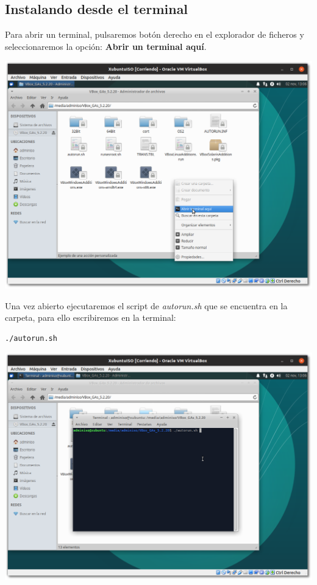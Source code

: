 \documentclass[11pt]{article}
\begin{document}
\subsection{Instalando desde el terminal}
\label{sec:org902a1d3}
Para abrir un terminal, pulsaremos botón derecho en el explorador de
ficheros y seleccionaremos la opción: \textbf{Abrir un terminal aquí}.

\begin{center}
\includegraphics[width=.9\linewidth]{imgs/VBox_GuestAdd_LinuX_016.png}
\end{center}

Una vez abierto ejecutaremos el script de \emph{autorun.sh} que se encuentra
en la carpeta, para ello escribiremos en la terminal:

\begin{verbatim}
./autorun.sh
\end{verbatim}

\begin{center}
\includegraphics[width=.9\linewidth]{imgs/VBox_GuestAdd_LinuX_017.png}
\end{center}
\end{document}

